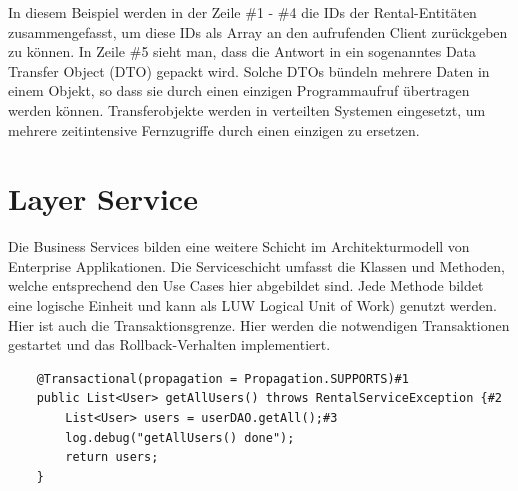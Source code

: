 \documentclass[a4paper,10pt]{scrreprt}
\begin{document}
\begin{description}
\begin{description}
In diesem Beispiel werden in der Zeile \#1 - \#4 die IDs der Rental-Entitäten zusammengefasst, um
diese IDs als Array an den aufrufenden Client zurückgeben zu können. In Zeile \#5 sieht man, dass
die Antwort in ein sogenanntes Data Transfer Object (DTO) gepackt wird. Solche DTOs bündeln
mehrere Daten in einem Objekt, so dass sie durch einen einzigen Programmaufruf übertragen
werden können. Transferobjekte werden in verteilten Systemen eingesetzt, um mehrere
zeitintensive Fernzugriffe durch einen einzigen zu ersetzen.
 \item 
\end{description}
\end{description}
\section{Layer Service}
Die Business Services bilden eine weitere Schicht im Architekturmodell von Enterprise
Applikationen. Die Serviceschicht umfasst die Klassen und Methoden, welche entsprechend den
Use Cases hier abgebildet sind. Jede Methode bildet eine logische Einheit und kann als LUW
Logical Unit of Work) genutzt werden. Hier ist auch die Transaktionsgrenze. Hier werden die
notwendigen Transaktionen gestartet und das Rollback-Verhalten implementiert.
\begin{lstlisting}
	@Transactional(propagation = Propagation.SUPPORTS)#1
	public List<User> getAllUsers() throws RentalServiceException {#2
		List<User> users = userDAO.getAll();#3
		log.debug("getAllUsers() done");
		return users;
	}
\end{lstlisting}
\end{document}

